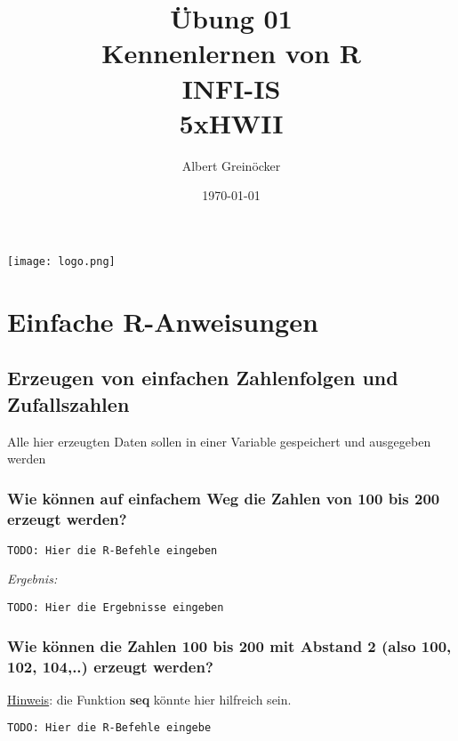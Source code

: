 \documentclass{article}
\title{Übung 01 \\ Kennenlernen von \textbf{R} \\ INFI-IS \\ 5xHWII}
\author{Albert Greinöcker} %
\date{\today} %
\begin{document}
\maketitle %

\begin{center}

\texttt{[image: logo.png]}
\end{center}
\vspace{1cm}

\section{Einfache R-Anweisungen}

\subsection{Erzeugen von einfachen Zahlenfolgen und Zufallszahlen}

Alle hier erzeugten Daten sollen in einer Variable gespeichert und ausgegeben werden

\subsubsection{Wie können auf einfachem Weg die Zahlen von 100 bis 200 erzeugt werden?}



\begin{lstlisting}
TODO: Hier die R-Befehle eingeben
\end{lstlisting}

\textit{Ergebnis:}

\begin{verbatim}
TODO: Hier die Ergebnisse eingeben
\end{verbatim}


\subsubsection{Wie können die Zahlen 100 bis 200 mit Abstand 2 (also 100, 102, 104,..) erzeugt werden?}

 \underline{Hinweis}: die Funktion \textbf{seq} könnte hier hilfreich sein.
 
 \begin{lstlisting}
TODO: Hier die R-Befehle eingebe
 \end{lstlisting}
 
\end{document}
